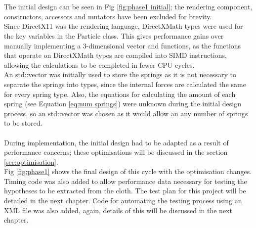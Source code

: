 \\\\The initial design can be seen in Fig \ref{fig:phase1 initial}; the rendering component, constructors, accessors and mutators have been excluded for brevity. 
\\Since DirectX11 was the rendering language, DirectXMath types were used for the key variables in the Particle class. This gives performance gains over manually implementing a 3-dimensional vector and functions, as the functions that operate on DirectXMath types are compiled into SIMD instructions, allowing the calculations to be completed in fewer CPU cycles.
\\An std::vector was initially used to store the springs as it is not necessary to separate the springs into types, since the internal forces are calculated the same for every spring type. Also, the equations for calculating the amount of each spring (see Equation \ref{eq:num springs}) were unknown during the initial design process, so an std::vector was chosen as it would allow an any number of springs to be stored.
\\\\During implementation, the initial design had to be adapted as a result of performance concerns; these optimisations will be discussed in the section \ref{sec:optimisation}.
\\Fig \ref{fig:phase1} shows the final design of this cycle with the optimisation changes. Timing code was also added to allow performance data necessary for testing the hypotheses to be extracted from the cloth. The test plan for this project will be detailed in the next chapter. Code for automating the testing process using an XML file was also added, again, details of this will be discussed in the next chapter.

